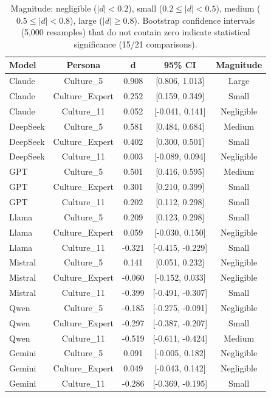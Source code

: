 \documentclass{article}
\begin{document}
\begin{table}[H]
\centering
\caption{Complete Cohen's d Effect Sizes for Novelty with 95\% Bootstrap CIs}
\label{tab:effects_complete}
\begin{tabular}{lcccc}
\toprule
Model & Persona & d & 95\% CI & Magnitude \\
\midrule
Claude & Culture\_5 & 0.908 & [0.806, 1.013] & Large \\
Claude & Culture\_Expert & 0.252 & [0.159, 0.349] & Small \\
Claude & Culture\_11 & 0.052 & [-0.041, 0.141] & Negligible \\
DeepSeek & Culture\_5 & 0.581 & [0.484, 0.684] & Medium \\
DeepSeek & Culture\_Expert & 0.402 & [0.300, 0.501] & Small \\
DeepSeek & Culture\_11 & 0.003 & [-0.089, 0.094] & Negligible \\
GPT & Culture\_5 & 0.501 & [0.416, 0.595] & Medium \\
GPT & Culture\_Expert & 0.301 & [0.210, 0.399] & Small \\
GPT & Culture\_11 & 0.202 & [0.112, 0.298] & Small \\
Llama & Culture\_5 & 0.209 & [0.123, 0.298] & Small \\
Llama & Culture\_Expert & 0.059 & [-0.030, 0.150] & Negligible \\
Llama & Culture\_11 & -0.321 & [-0.415, -0.229] & Small \\
Mistral & Culture\_5 & 0.141 & [0.051, 0.232] & Negligible \\
Mistral & Culture\_Expert & -0.060 & [-0.152, 0.033] & Negligible \\
Mistral & Culture\_11 & -0.399 & [-0.491, -0.307] & Small \\
Qwen & Culture\_5 & -0.185 & [-0.275, -0.091] & Negligible \\
Qwen & Culture\_Expert & -0.297 & [-0.387, -0.207] & Small \\
Qwen & Culture\_11 & -0.519 & [-0.611, -0.424] & Medium \\
Gemini & Culture\_5 & 0.091 & [-0.005, 0.182] & Negligible \\
Gemini & Culture\_Expert & 0.049 & [-0.043, 0.142] & Negligible \\
Gemini & Culture\_11 & -0.286 & [-0.369, -0.195] & Small \\
\bottomrule
\end{tabular}
\caption*{\footnotesize Magnitude: negligible ($|d| < 0.2$), small ($0.2 \le |d| < 0.5$), medium ($0.5 \le |d| < 0.8$), large ($|d| \ge 0.8$). Bootstrap confidence intervals (5,000 resamples) that do not contain zero indicate statistical significance (15/21 comparisons).}
\end{table}
\end{document}
